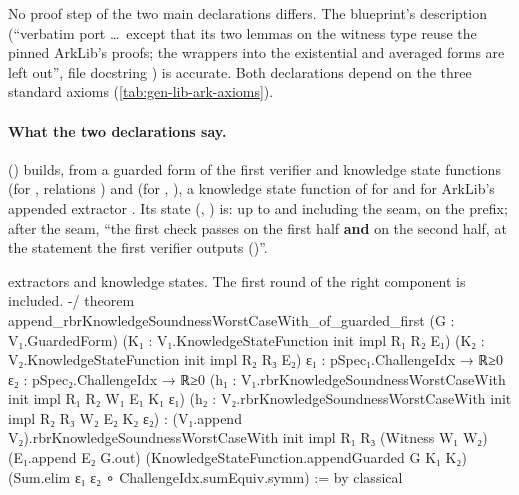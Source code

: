 No proof step of the two main declarations differs. The blueprint's description (\enquote{verbatim
port \dots\ except that its two lemmas on the witness type reuse the pinned ArkLib's proofs; the
wrappers into the existential and averaged forms are left out}, file docstring ) is
accurate. Both declarations depend on the three standard axioms (\cref{tab:gen-lib-ark-axioms}).

\paragraph{What the two declarations say.} \allowbreak{}\allowbreak{}
() builds, from a guarded form  of the first verifier
and knowledge state functions  (for , relations ) and 
(for , ), a knowledge state function of  for
 and for ArkLib's appended extractor . Its state
(, ) is: up to and including the seam,  on the prefix; after
the seam, \enquote{the first check passes on the first half \textbf{and}  on the second
half, at the statement the first verifier outputs ()}.

\begin{leancode}
extractors and knowledge states. The first round of the right component is included. -/
theorem append_rbrKnowledgeSoundnessWorstCaseWith_of_guarded_first (G : V₁.GuardedForm)
    (K₁ : V₁.KnowledgeStateFunction init impl R₁ R₂ E₁)
    (K₂ : V₂.KnowledgeStateFunction init impl R₂ R₃ E₂)
    {ε₁ : pSpec₁.ChallengeIdx → ℝ≥0} {ε₂ : pSpec₂.ChallengeIdx → ℝ≥0}
    (h₁ : V₁.rbrKnowledgeSoundnessWorstCaseWith init impl R₁ R₂ W₁ E₁ K₁ ε₁)
    (h₂ : V₂.rbrKnowledgeSoundnessWorstCaseWith init impl R₂ R₃ W₂ E₂ K₂ ε₂) :
    (V₁.append V₂).rbrKnowledgeSoundnessWorstCaseWith init impl R₁ R₃
      (Witness W₁ W₂) (E₁.append E₂ G.out) (KnowledgeStateFunction.appendGuarded G K₁ K₂)
      (Sum.elim ε₁ ε₂ ∘ ChallengeIdx.sumEquiv.symm) := by
  classical
\end{leancode}


